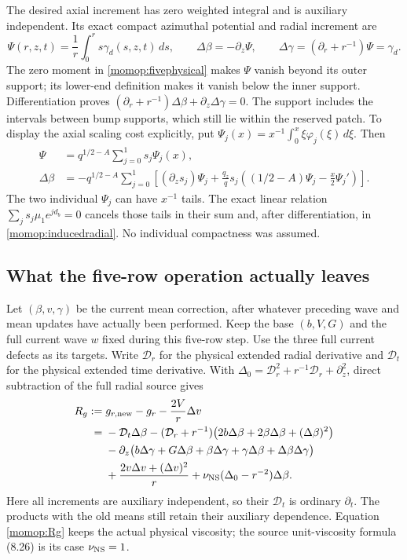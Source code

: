 The desired axial increment has zero weighted integral and is
auxiliary independent. Its exact compact azimuthal potential and
radial increment are
\[
 \Psi(r,z,t)=\frac1r\int_0^r s\gamma_d(s,z,t)\,ds,\qquad
 \Delta\beta=-\partial_z\Psi,\qquad
 \Delta\gamma=(\partial_r+r^{-1})\Psi=\gamma_d.
\]
The zero moment in \eqref{momop:fivephysical} makes $\Psi$ vanish
beyond its outer support; its lower-end definition makes it vanish
below the inner support. Differentiation proves
$(\partial_r+r^{-1})\Delta\beta+\partial_z\Delta\gamma=0$.
The support includes the intervals between bump supports, which still
lie within the reserved patch.
To display the axial scaling cost explicitly, put
$\Psi_j(x)=x^{-1}\int_0^x \xi\varphi_j(\xi)\,d\xi$. Then
\begin{align}
 \Psi&=q^{1/2-A}\sum_{j=0}^1s_j\Psi_j(x),\nonumber\\
 \Delta\beta
 &=-q^{1/2-A}\sum_{j=0}^1\left[
    (\partial_zs_j)\Psi_j+
    \frac{q_z}{q}s_j\left((1/2-A)\Psi_j
                                      -\frac x2\Psi_j'\right)\right].
 \label{momop:inducedradial}
\end{align}
The two individual $\Psi_j$ can have $x^{-1}$ tails. The exact
linear relation $\sum_js_j\mu_1e^{jd_b}=0$ cancels those tails
in their sum and, after differentiation, in \eqref{momop:inducedradial}.
No individual compactness was assumed.

\subsection{What the five-row operation actually leaves}

Let $(\beta,v,\gamma)$ be the current mean correction, after whatever
preceding wave and mean updates have actually been performed. Keep the
base $(b,V,G)$ and the full current wave $w$ fixed during this
five-row step. Use the three full current defects as its targets.
Write $\mathcal D_r$ for the physical extended radial derivative and
$\mathcal D_t$ for the physical extended time derivative. With
$\Delta_0=\mathcal D_r^2+r^{-1}\mathcal D_r+\partial_z^2$, direct
subtraction of the full radial source gives
\begin{align}
 R_g:={}&g_{r,\rm new}-g_r-\frac{2V}{r}\Delta v\nonumber\\
 ={}&-\mathcal D_t\Delta\beta
 -(\mathcal D_r+r^{-1})
             \bigl(2b\Delta\beta+2\beta\Delta\beta+(\Delta\beta)^2\bigr)
 \nonumber\\
 &-\partial_z\bigl(b\Delta\gamma+G\Delta\beta+
           \beta\Delta\gamma+\gamma\Delta\beta+\Delta\beta\Delta\gamma\bigr)
 \nonumber\\
 &+\frac{2v\Delta v+(\Delta v)^2}{r}
               +\nu_{\rm NS}(\Delta_0-r^{-2})\Delta\beta .
 \label{momop:Rg}
\end{align}
Here all increments are auxiliary independent, so their
$\mathcal D_t$ is ordinary $\partial_t$. The products with the
old means still retain their auxiliary dependence. Equation
\eqref{momop:Rg} keeps the actual physical viscosity; the source
unit-viscosity formula (8.26) is its case $\nu_{\rm NS}=1$.

